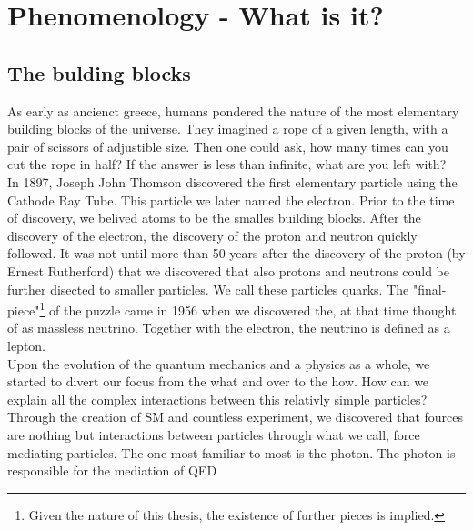 \section{Phenomenology - What is it?}
\subsection{The bulding blocks}
As early as ancienct greece, humans pondered the nature of the most elementary building blocks of
the universe. They imagined a rope of a given length, with a pair of scissors of adjustible size.
Then one could ask, how many times can you cut the rope in half? If the answer is less than infinite,
what are you left with?
\\
In 1897, Joseph John Thomson discovered the first elementary particle using the Cathode Ray Tube. 
This particle we later named the electron. Prior to the time of discovery, we belived atoms to 
be the smalles building blocks. After the discovery of the electron, the discovery of the 
proton and neutron quickly followed. It was not until more than 50 years after the discovery of 
the proton (by Ernest Rutherford) that we discovered that also protons and neutrons could be further
disected to smaller particles. We call these particles quarks. The "final-piece"\footnote{Given the
nature of this thesis, the existence of further pieces is implied.} of the puzzle came
in 1956 when we discovered the, at that time thought of as massless neutrino. Together
with the electron, the neutrino is defined as a lepton. 
\\
Upon the evolution of the quantum mechanics and a physics as a whole, we started to divert
our focus from the what and over to the how. How can we explain all the complex interactions
between this relativly simple particles? Through the creation of \ac{SM} and countless 
experiment, we discovered that fources are nothing but interactions between particles
through what we call, force mediating particles. The one most familiar to most is the photon.
The photon is responsible for the mediation of \ac{QED} 

